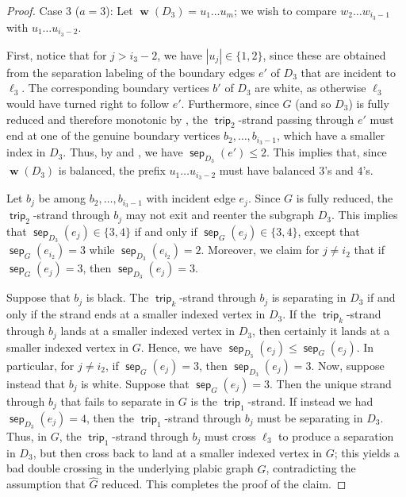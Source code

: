 \documentclass{amsart}
\theoremstyle{definition}
\theoremstyle{remark}
\numberwithin{equation}{section}
\DeclareMathOperator{\trip}{\mathsf{trip}}
\DeclareMathOperator{\bw}{\mathbf{w}}
\DeclareMathOperator{\sep}{\mathsf{sep}}
\begin{document}
\begin{proof}
\medskip
\noindent
{\sf Case 3 ($a=3$):}
Let $\bw(D_3)=u_1\ldots u_m$; we wish to compare $w_2 \ldots w_{i_3-1}$ with $u_1 \ldots u_{i_3-2}$. 

First, notice that for $j>i_3-2$, we have $|u_j| \in \{1,2\}$, since these are obtained from the separation labeling of the boundary edges $e'$ of $D_3$ that are incident to $\ell_3$. The corresponding boundary vertices $b'$ of $D_3$ are white, as otherwise $\ell_3$ would have turned right to follow $e'$. Furthermore, since $G$ (and so $D_3$) is fully reduced and therefore monotonic by , the $\trip_2$-strand passing through $e'$ must end at one of the genuine boundary vertices $b_2,\ldots,b_{i_3-1}$, which have a smaller index in $D_3$. Thus, by  and , we have $\sep_{D_3}(e') \leq 2$. This implies that, since $\bw(D_3)$ is balanced, the prefix $u_1\ldots u_{i_3-2}$ must have balanced $3$'s and $4$'s.

Let $b_j$ be among $b_2,\ldots,b_{i_3-1}$ with incident edge $e_j$. 
Since $G$ is fully reduced, the $\trip_2$-strand through $b_j$ may not exit and reenter the subgraph $D_3$. This implies that $\sep_{D_3}(e_j) \in \{3,4\}$ if and only if $\sep_G(e_j) \in \{3,4\}$, except that $\sep_G(e_{i_2})=3$ while $\sep_{D_3}(e_{i_2})=2$. Moreover, we claim for $j \neq i_2$ that if $\sep_{G}(e_j) = 3$, then $\sep_{D_3}(e_j) = 3$. 

Suppose that $b_j$ is black.
The $\trip_k$-strand through $b_j$ is separating in $D_3$ if and only if the strand ends at a smaller indexed vertex in $D_3$. If the $\trip_k$-strand through $b_j$ lands at a smaller indexed vertex in $D_3$, then certainly it lands at a smaller indexed vertex in $G$. Hence, we have $\sep_{D_3}(e_j) \leq \sep_G(e_j)$. In particular, for $j \neq i_2$, if $\sep_G(e_j)=3$, then $\sep_{D_3}(e_j) = 3$.
Now, suppose instead that $b_j$ is white. Suppose that $\sep_{G}(e_j) = 3$. Then the unique strand through $b_j$ that fails to separate in $G$ is the $\trip_1$-strand. If instead we had $\sep_{D_3}(e_j) = 4$, then the $\trip_1$-strand through $b_j$ must be separating in $D_3$. Thus, in $G$, the $\trip_1$-strand through $b_j$ must cross $\ell_3$ to produce a separation in $D_3$, but then cross back to land at a smaller indexed vertex in $G$; this yields a bad double crossing in the underlying plabic graph $\widehat{G}$, contradicting the assumption that $\widehat{G}$ reduced. This completes the proof of the claim.


\end{proof}
\end{document}
